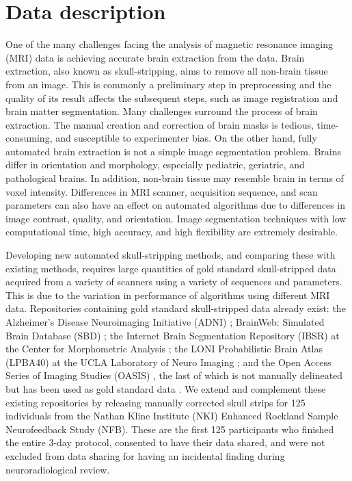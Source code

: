 \section*{Data description}

\par One of the many challenges facing the analysis of magnetic resonance imaging (MRI) data is achieving accurate brain extraction from the data. Brain extraction, also known as skull-stripping, aims to remove all non-brain tissue from an image. This is commonly a preliminary step in preprocessing and the quality of its result affects the subsequent steps, such as image registration and brain matter segmentation. Many challenges surround the process of brain extraction. The manual creation and correction of brain masks is tedious, time-consuming, and susceptible to experimenter bias. On the other hand, fully automated brain extraction is not a simple image segmentation problem. Brains differ in orientation and morphology, especially pediatric, geriatric, and pathological brains. In addition, non-brain tissue may resemble brain in terms of voxel intensity. Differences in MRI scanner, acquisition sequence, and scan parameters can also have an effect on automated algorithms due to differences in image contrast, quality, and orientation. Image segmentation techniques with low computational time, high accuracy, and high flexibility are extremely desirable.

\par Developing new automated skull-stripping methods, and comparing these with existing methods, requires large quantities of gold standard skull-stripped data acquired from a variety of scanners using a variety of sequences and parameters. This is due to the variation in performance of algorithms using different MRI data. Repositories containing gold standard skull-stripped data already exist: the Alzheimer's Disease Neuroimaging Initiative (ADNI) \cite{pmid17476317}; BrainWeb: Simulated Brain Database (SBD) \cite{brainweb}; the Internet Brain Segmentation Repository (IBSR) at the Center for Morphometric Analysis \cite{IBSR}; the LONI Probabilistic Brain Atlas (LPBA40) at the UCLA Laboratory of Neuro Imaging \cite{lpba40}; and the Open Access Series of Imaging Studies (OASIS) \cite{oasis}, the last of which is not manually delineated but has been used as gold standard data \cite{Iglesias2011, MASS}. We extend and complement these existing repositories by releasing manually corrected skull strips for 125 individuals from the Nathan Kline Institute (NKI) Enhanced Rockland Sample Neurofeedback Study (NFB). These are the first 125 participants who finished the entire 3-day protocol, consented to have their data shared, and were not excluded from data sharing for having an incidental finding during neuroradiological review.  

